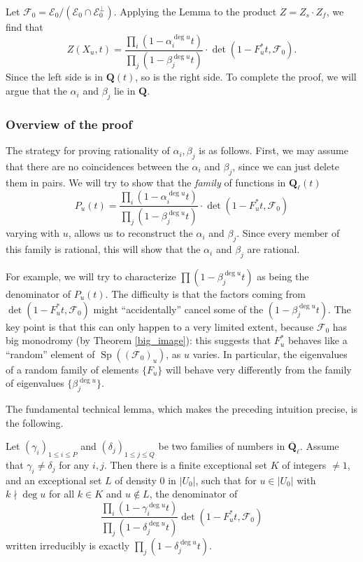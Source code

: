 \documentclass[letterpaper,11pt]{article}
\newcommand{\Q}{\mathbf{Q}}
\newcommand{\ol}[1]{\overline{#1}}
\newcommand{\Cal}[1]{\mathcal{#1}}
\DeclareMathOperator{\Sp}{Sp}
\begin{document}
Let $\Cal{F}_0 = \Cal{E}_0/(\Cal{E}_0 \cap \Cal{E}_0^{\perp})$. Applying the Lemma to the product $Z = Z_s \cdot Z_f$, we find that 
\[
Z(X_u, t) = \frac{\prod_i (1-\alpha_i^{\deg u} t)}{\prod_j (1-\beta_j^{\deg u} t) } \cdot \det (1-F_u^* t, \Cal{F}_0).
\]
Since the left side is in $\Q(t)$, so is the right side. To complete the proof, we will argue that the $\alpha_i$ and $\beta_j$ lie in $\Q$. 

\subsubsection{Overview of the proof}
The strategy for proving rationality of $\alpha_i, \beta_j$ is as follows. First, we may assume that there are no coincidences between the $\alpha_i$ and $\beta_j$, since we can just delete them in pairs. We will try to show that the \emph{family} of functions in $\Q_{\ell}(t)$ 
\[
P_u(t) = \frac{\prod_i (1-\alpha_i^{\deg u} t)}{\prod_j (1-\beta_j^{\deg u} t) } \cdot \det (1-F_u^* t, \Cal{F}_0)
\]
varying with $u$, allows us to reconstruct the $\alpha_i$ and $\beta_j$. Since every member of this family is rational, this will show that the $\alpha_i$ and $\beta_j$ are rational. 

For example, we will try to characterize $ \prod (1-\beta_j^{\deg u} t)$ as being the denominator of $P_u(t)$. The difficulty is that the factors coming from $\det (1-F_u^* t, \Cal{F}_0)$ might ``accidentally'' cancel some of the $(1-\beta_j^{\deg u} t)$. The key point is that this can only happen to a very limited extent, because $\Cal{F}_0$ has big monodromy (by Theorem \ref{big_image}): this suggests that $F_u^*$ behaves like a ``random'' element of $\Sp((\Cal{F}_0)_u)$, as $u$ varies. In particular, the eigenvalues of a random family of elements $\{F_u\}$ will behave very differently from the family of eigenvalues $\{\beta_j^{\deg u}\}$. 

The fundamental technical lemma, which makes the preceding intuition precise, is the following. 

\begin{prop}\label{tech_lemma}
Let $(\gamma_i)_{1 \leq i \leq P}$ and $(\delta_j)_{1 \leq j \leq Q}$ be two families of numbers in $\ol{\Q}_{\ell}$. Assume that $\gamma_i \neq \delta_j$ for any $i,j$. Then there is a finite exceptional set $K$ of integers $\neq 1$, and an exceptional set $L$ of density $0$ in $|U_0|$, such that for $u \in |U_0|$ with $k \nmid \deg u$ for all $k \in K$ and $u \notin L$, the denominator of 
\[
\frac{\prod_i (1-\gamma_i^{\deg u} t)}{\prod_j (1-\delta_j^{\deg u} t) } \det (1-F_u^* t, \Cal{F}_0) 
\]
written irreducibly is exactly $\prod_j (1-\delta_j^{\deg u} t)$. 
\end{prop} 
\end{document}
